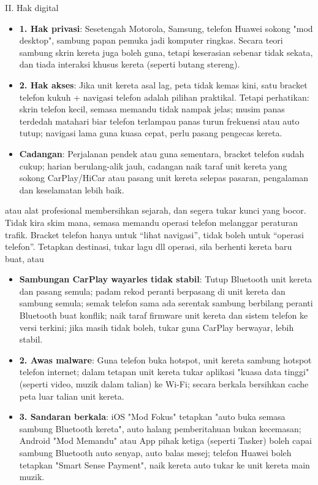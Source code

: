 
II. Hak digital

\begin{itemize}
  \item \textbf{1. Hak privasi}: Sesetengah Motorola, Samsung, telefon Huawei sokong "mod desktop", sambung papan pemuka jadi komputer ringkas. Secara teori sambung skrin kereta juga boleh guna, tetapi keserasian sebenar tidak sekata, dan tiada interaksi khusus kereta (seperti butang stereng).
  \item \textbf{2. Hak akses}: Jika unit kereta asal lag, peta tidak kemas kini, satu bracket telefon kukuh + navigasi telefon adalah pilihan praktikal. Tetapi perhatikan: skrin telefon kecil, semasa memandu tidak nampak jelas; musim panas terdedah matahari biar telefon terlampau panas turun frekuensi atau auto tutup; navigasi lama guna kuasa cepat, perlu pasang pengecas kereta.
  \item \textbf{Cadangan}: Perjalanan pendek atau guna sementara, bracket telefon sudah cukup; harian berulang-alik jauh, cadangan naik taraf unit kereta yang sokong CarPlay/HiCar atau pasang unit kereta selepas pasaran, pengalaman dan keselamatan lebih baik.
\end{itemize}

\begin{tcbwarn}{atau alat profesional membersihkan sejarah, dan segera tukar kunci yang bocor.}
Tidak kira skim mana, semasa memandu operasi telefon melanggar peraturan trafik. Bracket telefon hanya untuk “lihat navigasi”, tidak boleh untuk “operasi telefon”. Tetapkan destinasi, tukar lagu dll operasi, sila berhenti kereta baru buat, atau

\end{tcbwarn}


\begin{itemize}
  \item \textbf{Sambungan CarPlay wayarles tidak stabil}: Tutup Bluetooth unit kereta dan pasang semula; padam rekod peranti berpasang di unit kereta dan sambung semula; semak telefon sama ada serentak sambung berbilang peranti Bluetooth buat konflik; naik taraf firmware unit kereta dan sistem telefon ke versi terkini; jika masih tidak boleh, tukar guna CarPlay berwayar, lebih stabil.
  \item \textbf{2. Awas malware}: Guna telefon buka hotspot, unit kereta sambung hotspot telefon internet; dalam tetapan unit kereta tukar aplikasi "kuasa data tinggi" (seperti video, muzik dalam talian) ke Wi-Fi; secara berkala bersihkan cache peta luar talian unit kereta.
  \item \textbf{3. Sandaran berkala}: iOS "Mod Fokus" tetapkan "auto buka semasa sambung Bluetooth kereta", auto halang pemberitahuan bukan kecemasan; Android "Mod Memandu" atau App pihak ketiga (seperti Tasker) boleh capai sambung Bluetooth auto senyap, auto balas mesej; telefon Huawei boleh tetapkan "Smart Sense Payment", naik kereta auto tukar ke unit kereta main muzik.
\end{itemize}


